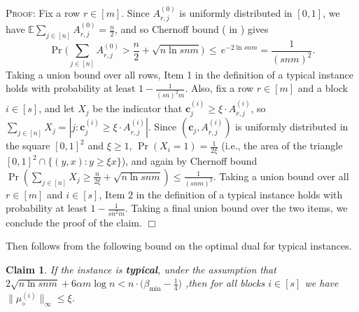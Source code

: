 \documentclass{article}
\newcommand{\E}{\mathbb{E}}
\newcommand{\cv}[0]{\mathbf{c}}
\newtheorem{claim}[thm]{Claim}
\newenvironment{proof}[1][]
   {\textsc{Proof#1: }}
   {\hfill$\Box$\smallskip}
\begin{document}
\begin{proof}
    Fix a row $r \in [m]$. Since $A^{(0)}_{r,j}$ is uniformly distributed in $[0,1]$, we have $\E \sum_{j \in [n]} A^{(0)}_{r,j} = \frac{n}{2}$, and so Chernoff bound ( in ) gives $$\Pr\bigg(\sum_{j \in [n]} A^{(0)}_{r,j} > \frac{n}{2} + \sqrt{n \ln s n m}\bigg) \,\le\, e^{-2\ln s n m} = \frac{1}{(snm)^2}.$$ Taking a union bound over all rows, Item 1 in the definition of a typical instance holds with probability at least $1- \frac{1}{(sn)^2 m}$. Also, fix a row $r \in [m]$ and a block $i \in [s]$, and let $X_j$ be the indicator that $\cv^{(i)}_j \ge \xi \cdot A^{(i)}_{r,j}$, so $\sum_{j \in [n]} X_j = |j : \cv^{(i)}_j \ge \xi \cdot A^{(i)}_{r,j}|$. Since $(\cv_j, A^{(i)}_{r,j})$ is uniformly distributed in the square $[0,1]^2$ and $\xi \ge 1$, $\Pr(X_i = 1) = \frac{1}{2 \xi}$ (i.e., the area of the triangle $[0,1]^2 \cap \{(y,x) : y \ge \xi x\}$), and again by Chernoff bound $\Pr(\sum_{j \in [n]} X_j \ge \frac{n}{2 \xi} + \sqrt{n \ln s n m}) \le \frac{1}{(snm)^2}$. Taking a union bound over all $r \in [m]$ and $i \in [s]$, Item 2 in the definition of a typical instance holds with probability at least $1 - \frac{1}{s n^2 m}$. Taking a final union bound over the two items, we conclude the proof of the claim.
\end{proof}

    Then  follows from the following bound on the optimal dual for typical instances.  

\begin{claim} \label{claim:dualFriendly}
    If the instance is \textbf{typical}, under the assumption that $2 \sqrt{n \ln s n m} + 6\alpha m \log n < n \cdot \big(\beta_{\min} - \frac{1}{4}\big)$ ,then for all blocks $i \in [s]$ we have $\|\mu_\diamond^{(i)}\|_{\infty} \leq \xi$.
\end{claim}
\end{document}
